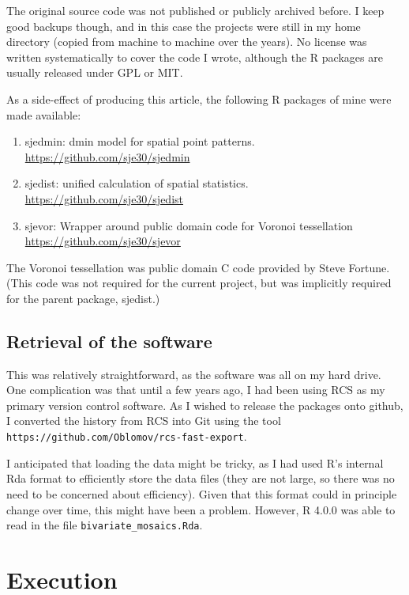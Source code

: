The original source code was not published or publicly archived
before. I keep good backups though, and in this case the projects were
still in my home directory (copied from machine to machine over the
years). No license was written systematically to cover the code I
wrote, although the R packages are usually released under GPL or MIT.

As a side-effect of producing this article, the following R packages of
mine were made available:

\begin{enumerate}
\item
  sjedmin: dmin model for spatial point patterns.
  \url{https://github.com/sje30/sjedmin}
\item
  sjedist: unified calculation of spatial statistics.
  \url{https://github.com/sje30/sjedist}
\item
  sjevor: Wrapper around public domain code for Voronoi tessellation
  \url{https://github.com/sje30/sjevor}
\end{enumerate}

The Voronoi tessellation was public domain C code provided by Steve
Fortune\supercite{Fortune1987-kg}. (This code was not required for the current
project, but was implicitly required for the parent package, sjedist.)

\subsection{Retrieval of the software}

This was relatively straightforward, as the software was all on my hard
drive. One complication was that until a few years ago, I had been using
RCS as my primary version control software. As I wished to release the
packages onto github, I converted the history from RCS into Git using
the tool \texttt{https://github.com/Oblomov/rcs-fast-export}.

I anticipated that loading the data might be tricky, as I had used R's
internal Rda format to efficiently store the data files (they are not
large, so there was no need to be concerned about efficiency). Given
that this format could in principle change over time, this might have
been a problem. However, R 4.0.0 was able to read in the file
\texttt{bivariate\_mosaics.Rda}.

\section{Execution}


